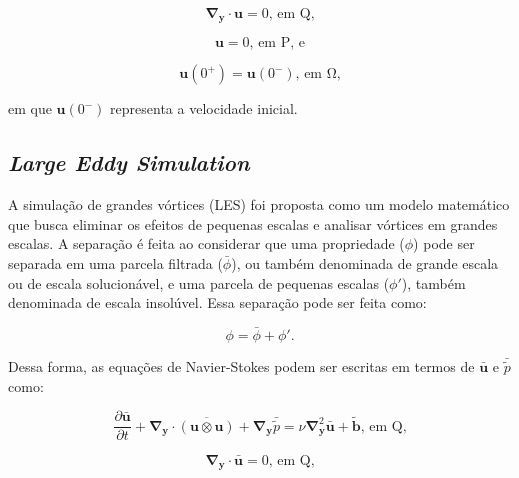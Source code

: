 \documentclass[_ArquivoPrincipal.tex]{subfiles}
\begin{document}
\begin{equation}
    \mathbf{\nabla}_\mathbf{y}\cdot\mathbf{u}=0\text{, em }\mathrm{Q}\text{,}
    \label{Sist2}
\end{equation}

\begin{equation}
    \mathbf{u}=0\text{, em }\mathrm{P}\text{, e}
    \label{Sist3}
\end{equation}

\begin{equation}
    \mathbf{u}(0^+)=\mathbf{u}(0^-)\text{, em }\mathrm{\Omega}\text{,}
    \label{Sist4}
\end{equation}

\noindent em que $\mathbf{u}(0^-)$ representa a velocidade inicial.

\subsection{\textit{Large Eddy Simulation}} \label{LES}

A simulação de grandes vórtices (LES) foi proposta como um modelo matemático que busca eliminar os efeitos de pequenas escalas e analisar vórtices em grandes escalas. A separação é feita ao considerar que uma propriedade ($\phi$) pode ser separada em uma parcela filtrada ($\bar{\phi}$), ou também denominada de grande escala ou de escala solucionável, e uma parcela de pequenas escalas ($\phi'$), também denominada de escala insolúvel. Essa separação pode ser feita como:

\begin{equation}
    \phi=\bar{\phi}+\phi'\text{.}
    \label{Sep}
\end{equation}

Dessa forma, as equações de Navier-Stokes podem ser escritas em termos de $\bar{\mathbf{u}}$ e $\bar{\tilde{p}}$ como:

\begin{equation}
    \frac{\partial\bar{\mathbf{u}}}{\partial t}+\mathbf{\nabla}_\mathbf{y}\cdot\overline{(\mathbf{u}\otimes\mathbf{u})}+\mathbf{\nabla}_\mathbf{y}\bar{\tilde{p}}=\nu\mathbf{\nabla}^2_\mathbf{y}\bar{\mathbf{u}}+\tilde{\mathbf{b}}\text{, em }\mathrm{Q}\text{,}
    \label{SistFilt1}
\end{equation}

\begin{equation}
    \mathbf{\nabla}_\mathbf{y}\cdot\bar{\mathbf{u}}=0\text{, em }\mathrm{Q}\text{,}
    \label{SistFilt2}
\end{equation}
\end{document}
